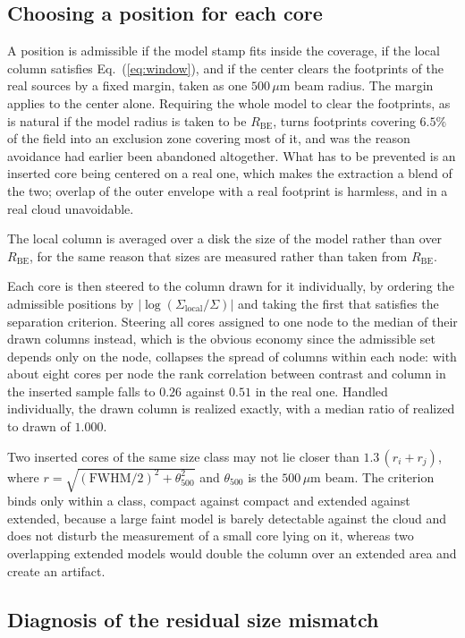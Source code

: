 \documentclass[11pt,a4paper]{article}
\newcommand{\Rbe}{R_{\mathrm{BE}}}
\begin{document}
\subsection{Choosing a position for each core}

A position is admissible if the model stamp fits inside the coverage, if the
local column satisfies Eq.~(\ref{eq:window}), and if the center clears the
footprints of the real sources by a fixed margin, taken as one $500\,\mu$m
beam radius. The margin applies to the center alone. Requiring the whole model
to clear the footprints, as is natural if the model radius is taken to be
$\Rbe$, turns footprints covering $6.5\%$ of the field into an exclusion zone
covering most of it, and was the reason avoidance had earlier been abandoned
altogether. What has to be prevented is an inserted core being centered on a
real one, which makes the extraction a blend of the two; overlap of the outer
envelope with a real footprint is harmless, and in a real cloud unavoidable.

The local column is averaged over a disk the size of the model rather than
over $\Rbe$, for the same reason that sizes are measured rather than taken
from $\Rbe$.

Each core is then steered to the column drawn for it individually, by ordering
the admissible positions by $|\log(\Sigma_{\mathrm{local}}/\Sigma)|$ and taking
the first that satisfies the separation criterion. Steering all cores assigned
to one node to the median of their drawn columns instead, which is the obvious
economy since the admissible set depends only on the node, collapses the
spread of columns within each node: with about eight cores per node the rank
correlation between contrast and column in the inserted sample falls to
$0.26$ against $0.51$ in the real one. Handled individually, the drawn column
is realized exactly, with a median ratio of realized to drawn of $1.000$.

Two inserted cores of the same size class may not lie closer than
$1.3\,(r_{i}+r_{j})$, where $r = \sqrt{(\mathrm{FWHM}/2)^{2}+\theta_{500}^{2}}$
and $\theta_{500}$ is the $500\,\mu$m beam. The criterion binds only within a
class, compact against compact and extended against extended, because a large
faint model is barely detectable against the cloud and does not disturb the
measurement of a small core lying on it, whereas two overlapping extended
models would double the column over an extended area and create an artifact.

\subsection{Diagnosis of the residual size mismatch}
\end{document}
